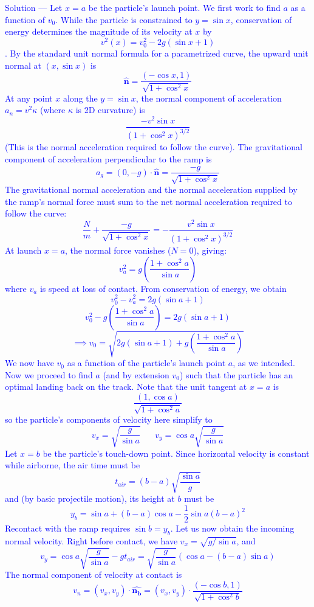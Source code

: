 \documentclass[12pt]{article}
\begin{document}
\textcolor{blue}{Solution — Let $x=a$ be the particle's launch point. We first work to find $a$ as a function of $v_0$. While the particle is constrained to $y = \sin{x}$, conservation of energy determines the magnitude of its velocity at $x$ by $$v^2(x) = v_0^2 -2g(\sin{x} + 1)$$. By the standard unit normal formula for a parametrized curve, the upward unit normal at $(x, \sin{x})$ is $$\mathbf{\hat{n}} = \frac{(-\cos{x}, 1)}{\sqrt{1 + \cos^2{x}}}$$ 
At any point $x$ along the $y = \sin{x}$, the normal component of acceleration $a_n = v^2 \kappa$ (where $\kappa$ is 2D curvature) is $$\frac{-v^2 \sin{x}}{(1 + \cos^2{x})^{3/2}}$$ (This is the normal acceleration required to follow the curve). The gravitational component of acceleration perpendicular to the ramp is $$a_g = (0, -g) \cdot \mathbf{\hat{n}} = \frac{-g}{\sqrt{1 + \cos^2{x}}}$$ The gravitational normal acceleration and the normal acceleration supplied by the ramp's normal force must sum to the net normal acceleration required to follow the curve: $$\frac{N}{m} + \frac{-g}{\sqrt{1 + \cos^2{x}}} = - \frac{v^2 \sin{x}}{(1 + \cos^2{x})^{3/2}}$$ At launch $x=a$, the normal force vanishes ($N=0$), giving: $$v_a^2 = g \left( \frac{1 + \cos^2{a}}{\sin a} \right)$$ where $v_a$ is speed at loss of contact. From conservation of energy, we obtain 
$$v_0^2 - v_a^2 =  2g(\sin{a} + 1)$$ $$v_0^2 - g\left( \frac{1 + \cos^2{a}}{\sin{a}} \right) = 2g(\sin a + 1)$$
$$\implies v_0 = \sqrt{2g(\sin{a} + 1) + g\left( \frac{1 + \cos^2{a}}{\sin{a}} \right)}$$
We now have $v_0$ as a function of the particle's launch point $a$, as we intended. Now we proceed to find $a$ (and by extension $v_0$) such that the particle has an optimal landing back on the track. Note that the unit tangent at $x=a$ is $$\frac{(1, \cos{a})}{\sqrt{1 + \cos^2 a}}$$ so the particle's components of velocity here simplify to $$v_x = \sqrt{\frac{g}{\sin{a}}} \;\;\;\;\;\; v_y = \cos{a} \sqrt{\frac{g}{\sin{a}}}$$ Let $x=b$ be the particle's touch-down point. Since horizontal velocity is constant while airborne, the air time must be $$t_{air} = (b-a)\sqrt{\frac{\sin{a}}{g}}$$ and (by basic projectile motion), its height at $b$ must be
$$y_b = \sin{a} + (b-a)\cos{a} - \frac{1}{2} \sin{a} (b-a)^2$$ Recontact with the ramp requires $\sin{b} = y_b$. Let us now obtain the incoming normal velocity. Right before contact, we have $v_x = \sqrt{g/ \sin{a}}$, and $$v_y = \cos {a} \sqrt{\frac{g}{\sin a}} - gt_{air} = \sqrt{\frac{g}{\sin a}} (\cos{a} - (b-a)\sin{a})$$ The normal component of velocity at contact is 
$$v_n = (v_x, v_y) \cdot \mathbf{\hat{n_b}} = (v_x, v_y) \cdot \frac{(-\cos b, 1)}{\sqrt{1 + \cos^2 b}} $$
}
\end{document}
